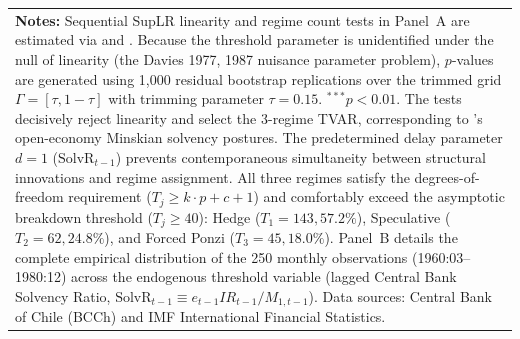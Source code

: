 \begin{table}[htbp]
\begin{tabularx}{\textwidth}{X}
\footnotesize \textbf{Notes:} Sequential SupLR linearity and regime count tests in Panel~A are estimated via \citet{Hansen1996,Hansen1999} and \citet{Stigler2019}. Because the threshold parameter is unidentified under the null of linearity (the Davies 1977, 1987 nuisance parameter problem), $p$-values are generated using 1,000 residual bootstrap replications over the trimmed grid $\Gamma = [\tau, 1-\tau]$ with trimming parameter $\tau = 0.15$. $^{***} p < 0.01$. The tests decisively reject linearity and select the 3-regime TVAR, corresponding to \citet{Foley2003}'s open-economy Minskian solvency postures. The predetermined delay parameter $d=1$ ($\text{SolvR}_{t-1}$) prevents contemporaneous simultaneity between structural innovations and regime assignment. All three regimes satisfy the degrees-of-freedom requirement ($T_j \ge k \cdot p + c + 1$) and comfortably exceed the asymptotic breakdown threshold ($T_j \ge 40$): Hedge ($T_1=143, 57.2\%$), Speculative ($T_2=62, 24.8\%$), and Forced Ponzi ($T_3=45, 18.0\%$). Panel~B details the complete empirical distribution of the 250 monthly observations (1960:03--1980:12) across the endogenous threshold variable (lagged Central Bank Solvency Ratio, $\text{SolvR}_{t-1} \equiv e_{t-1} IR_{t-1} / M_{1,t-1}$). Data sources: Central Bank of Chile (BCCh) and IMF International Financial Statistics.
\end{tabularx}
\end{table}
